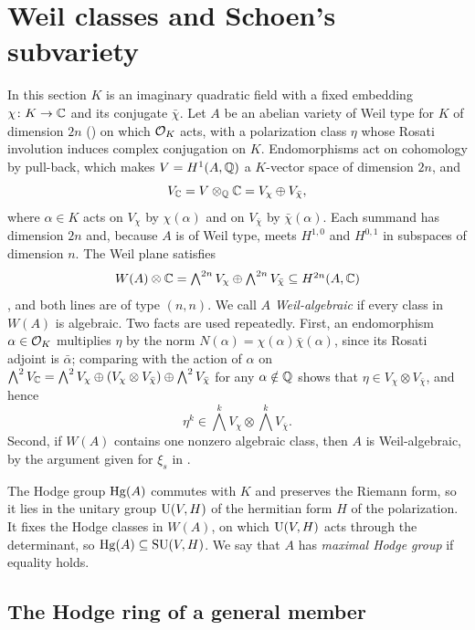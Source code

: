 \section{Weil classes and Schoen's subvariety}\label{sec:weil}

In this section $K$ is an imaginary quadratic field with a fixed embedding
$\chi\colon K\to\mathbb{C}$ and its conjugate $\bar\chi$. Let $A$ be an abelian
variety of Weil type for $K$ of dimension $2n$ () on
which $\mathcal{O}_{K}$ acts, with a polarization class $\eta$ whose Rosati
involution induces complex conjugation on $K$. Endomorphisms act on
cohomology by pull-back, which makes $V=H^{1}(A,\mathbb{Q})$ a $K$-vector space of
dimension $2n$, and
\[
  V_{\mathbb{C}}=V\otimes_{\mathbb{Q}}\mathbb{C}=V_{\chi}\oplus V_{\bar\chi},
\]
where $\alpha\in K$ acts on $V_{\chi}$ by $\chi(\alpha)$ and on
$V_{\bar\chi}$ by $\bar\chi(\alpha)$. Each summand has dimension $2n$ and,
because $A$ is of Weil type, meets $H^{1,0}$ and $H^{0,1}$ in subspaces of
dimension $n$. The Weil plane satisfies
\[
  W(A)\otimes\mathbb{C}=\textstyle\bigwedge^{2n}V_{\chi}\oplus\bigwedge^{2n}V_{\bar\chi}
  \subseteq H^{2n}(A,\mathbb{C})
\]
\cite[\S4]{Del82}, and both lines are of type $(n,n)$. We call $A$
\emph{Weil-algebraic} if every class in $W(A)$ is algebraic. Two facts are
used repeatedly. First, an endomorphism $\alpha\in\mathcal{O}_{K}$ multiplies
$\eta$ by the norm $N(\alpha)=\chi(\alpha)\bar\chi(\alpha)$, since its Rosati
adjoint is $\bar\alpha$; comparing with the action of $\alpha$ on
$\bigwedge^{2}V_{\mathbb{C}}=\bigwedge^{2}V_{\chi}\oplus(V_{\chi}\otimes
V_{\bar\chi})\oplus\bigwedge^{2}V_{\bar\chi}$ for any $\alpha\notin\mathbb{Q}$ shows
that $\eta\in V_{\chi}\otimes V_{\bar\chi}$, and hence
\begin{equation}\label{eq:etapower}
  \eta^{k}\in\textstyle\bigwedge^{k}V_{\chi}\otimes\bigwedge^{k}V_{\bar\chi}.
\end{equation}
Second, if $W(A)$ contains one nonzero algebraic class, then $A$ is
Weil-algebraic, by the argument given for $\xi_{s}$ in
.

The Hodge group $\operatorname{Hg}(A)$ commutes with $K$ and preserves the Riemann form,
so it lies in the unitary group $\operatorname{U}(V,H)$ of the hermitian form $H$ of the
polarization. It fixes the Hodge classes in $W(A)$, on which $\operatorname{U}(V,H)$ acts
through the determinant, so $\operatorname{Hg}(A)\subseteq\operatorname{SU}(V,H)$. We say that $A$ has
\emph{maximal Hodge group} if equality holds.

\subsection{The Hodge ring of a general member}

